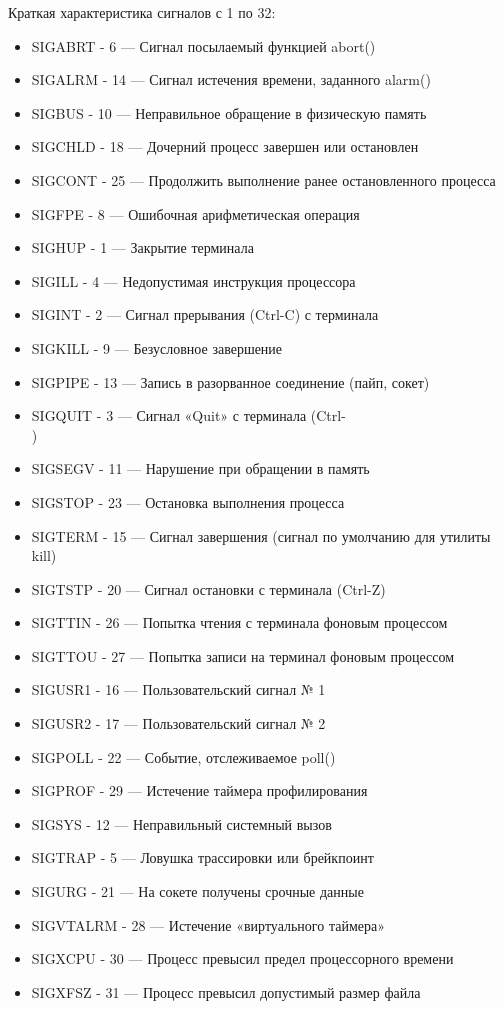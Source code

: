 \documentclass[a4paper]{article}
\begin{document}
	Краткая характеристика сигналов с 1 по 32:
	\begin{itemize}
		\item SIGABRT -	6 --- Сигнал посылаемый функцией abort()
		\item SIGALRM - 14 --- Сигнал истечения времени, заданного alarm()
		\item SIGBUS - 10 --- Неправильное обращение в физическую память
		\item SIGCHLD - 18 --- Дочерний процесс завершен или остановлен
		\item SIGCONT - 25 --- Продолжить выполнение ранее остановленного процесса
		\item SIGFPE - 8 --- Ошибочная арифметическая операция
		\item SIGHUP - 1 --- Закрытие терминала
		\item SIGILL - 4 --- Недопустимая инструкция процессора
		\item SIGINT - 2 --- Сигнал прерывания (Ctrl-C) с терминала
		\item SIGKILL - 9 --- Безусловное завершение
		\item SIGPIPE - 13 --- Запись в разорванное соединение (пайп, сокет)
		\item SIGQUIT - 3 --- Сигнал «Quit» с терминала (Ctrl-\\)
		\item SIGSEGV - 11 --- Нарушение при обращении в память
		\item SIGSTOP - 23 --- Остановка выполнения процесса
		\item SIGTERM - 15 --- Сигнал завершения (сигнал по умолчанию для утилиты kill)
		\item SIGTSTP - 20 --- Сигнал остановки с терминала (Ctrl-Z)
		\item SIGTTIN - 26 --- Попытка чтения с терминала фоновым процессом	
		\item SIGTTOU - 27 --- Попытка записи на терминал фоновым процессом	
		\item SIGUSR1 - 16 --- Пользовательский сигнал № 1
		\item SIGUSR2 - 17 --- Пользовательский сигнал № 2
		\item SIGPOLL - 22 --- Событие, отслеживаемое poll()
		\item SIGPROF - 29 --- Истечение таймера профилирования	
		\item SIGSYS - 12 --- Неправильный системный вызов
		\item SIGTRAP - 5 --- Ловушка трассировки или брейкпоинт
		\item SIGURG - 21 --- На сокете получены срочные данные
		\item SIGVTALRM - 28 --- Истечение «виртуального таймера»
		\item SIGXCPU - 30 --- Процесс превысил предел процессорного времени
		\item SIGXFSZ - 31 --- Процесс превысил допустимый размер файла
	\end{itemize}
	
\end{document}
